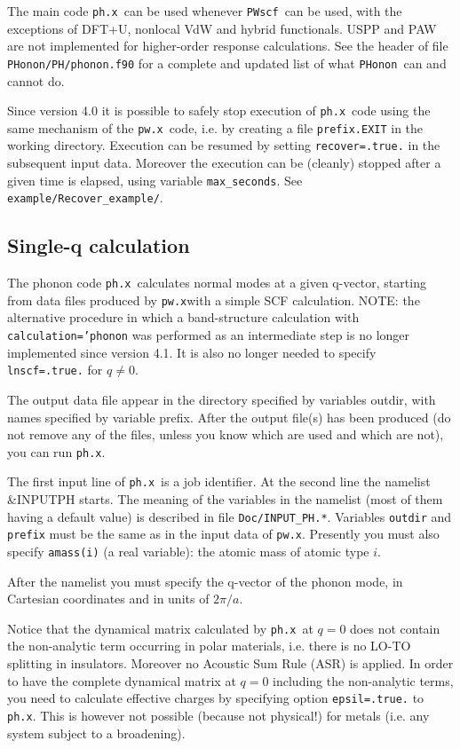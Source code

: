 \documentclass[12pt,a4paper]{article}
\def\pwx{\texttt{pw.x}}
\def\phx{\texttt{ph.x}}
\def\PWscf{\texttt{PWscf}}
\def\PHonon{\texttt{PHonon}}
\begin{document}
The main code \phx\ can be used whenever \PWscf\ can be 
used, with the exceptions of DFT+U, nonlocal VdW and hybrid functionals. 
USPP and PAW are not implemented for higher-order response calculations.
See the header of file \texttt{PHonon/PH/phonon.f90} for a complete and
updated list of what \PHonon\ can and cannot do.

Since version 4.0 it is possible to safely stop execution of \phx\ code using
the same mechanism of the \pwx\ code, i.e. by creating a file 
\texttt{prefix.EXIT} in the working directory. Execution can be resumed by 
setting \texttt{recover=.true.} in the subsequent input data.
Moreover the execution can be (cleanly) stopped after a given time is elapsed,
using variable \texttt{max\_seconds}. See \texttt{example/Recover\_example/}.

\subsection{Single-q calculation}

The phonon code \phx\ calculates normal modes at a given q-vector, starting
from data files produced by \pwx with a simple SCF calculation.
NOTE: the alternative procedure in which a band-structure calculation 
with \texttt{calculation='phonon} was performed as an intermediate step is no
longer implemented since version 4.1. It is also no longer needed to
specify \texttt{lnscf=.true.} for $q\ne 0$.

The output data file appear in the directory specified by variables outdir,
with names specified by variable prefix. After the output file(s) has been
produced (do not remove any of the files, unless you know which are used
and which are not), you can run \phx.
    
The first input line of \phx\ is a job identifier. At the second line the
namelist \&INPUTPH starts. The meaning of the variables in the namelist
(most of them having a default value) is described in file 
\texttt{Doc/INPUT\_PH.*}. Variables \texttt{outdir} and \texttt{prefix} 
must be the same as in the input data of \pwx. Presently
you must also specify \texttt{amass(i)} (a real variable): the atomic mass 
of atomic type $i$.

After the namelist you must specify the q-vector of the phonon mode,
in Cartesian coordinates and in units of $2\pi/a$.
    
Notice that the dynamical matrix calculated by \phx\ at $q=0$ does not
contain the non-analytic term occurring in polar materials, i.e. there is no
LO-TO splitting in insulators. Moreover no Acoustic Sum Rule (ASR) is
applied. In order to have the complete dynamical matrix at $q=0$ including
the non-analytic terms, you need to calculate effective charges by specifying
option \texttt{epsil=.true.} to \phx. This is however not possible (because
not physical!) for metals (i.e. any system subject to a broadening).
\end{document}

